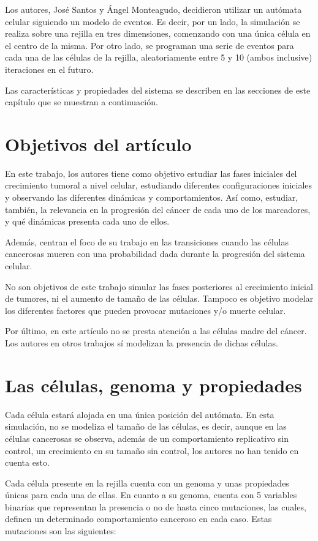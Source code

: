 Los autores, José Santos y Ángel Monteagudo, decidieron utilizar un autómata celular
siguiendo un modelo de eventos. Es decir, por un lado, la simulación se realiza
sobre una rejilla en tres dimensiones, comenzando con una única célula en el centro de la misma.
Por otro lado, se programan una serie de eventos para cada una de las células de la rejilla, aleatoriamente
entre 5 y 10 (ambos inclusive) iteraciones en el futuro.

Las características y propiedades del sistema se describen en las secciones de este capítulo que
se muestran a continuación.

\section{Objetivos del artículo}

En este trabajo, los autores tiene como objetivo estudiar las fases iniciales del crecimiento tumoral a nivel celular,
estudiando diferentes configuraciones iniciales y observando las diferentes dinámicas y comportamientos. Así como,
estudiar, también, la relevancia en la progresión del cáncer de cada uno de los marcadores, y qué
dinámicas presenta cada uno de ellos.

Además, centran el foco de su trabajo en las transiciones cuando las células cancerosas
mueren con una probabilidad dada durante la progresión del sistema celular.

No son objetivos de este trabajo simular las fases posteriores al crecimiento inicial de tumores, ni el
aumento de tamaño de las células. Tampoco es objetivo modelar los diferentes factores que
pueden provocar mutaciones y/o muerte celular.

Por último, en este artículo no se presta atención a las células madre del cáncer. Los autores en
otros trabajos \cite{jsantos-amonteagudo-2015} sí modelizan la presencia de dichas células.

\section{Las células, genoma y propiedades}

Cada célula estará alojada en una única posición del autómata. En esta simulación, no se modeliza
el tamaño de las células, es decir, aunque en las células cancerosas se observa, además de un comportamiento
replicativo sin control, un crecimiento en su tamaño sin control, los autores no han tenido en cuenta esto.

Cada célula presente en la rejilla cuenta con un genoma y unas propiedades únicas para cada una de ellas.
En cuanto a su genoma, cuenta con 5 variables binarias que representan la presencia o no de hasta cinco mutaciones, las cuales, definen
un determinado comportamiento canceroso en cada caso. Estas mutaciones son las siguientes:

